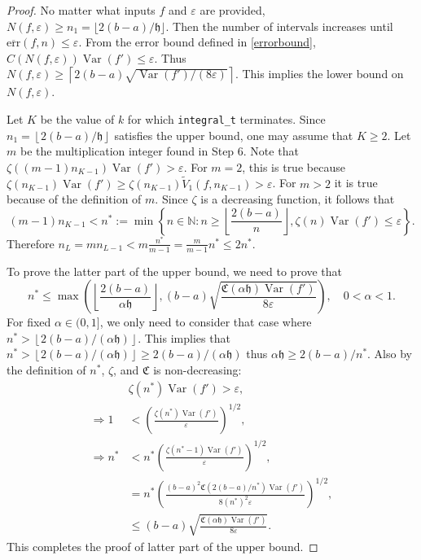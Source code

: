 \documentclass{iitthesis}
\DeclareMathOperator{\Var}{Var}
\theoremstyle{definition}
\theoremstyle{remark}
\begin{document}
\begin{proof}
  No matter what inputs $f$ and $\varepsilon$ are provided, $N(f,\varepsilon)\ge n_1=\lfloor 2(b-a)/\mathfrak{h}\rfloor$. Then the number of intervals increases until $\overline{\text{err}}(f,n)\le\varepsilon$. From the error bound defined in \eqref{errorbound}, $C(N(f,\varepsilon))\Var(f')\leq \varepsilon$. Thus $N(f,\varepsilon)\geq \left\lceil2(b-a)\sqrt{\Var(f')/(8\varepsilon)}\right\rceil$. This implies the lower bound on $N(f,\varepsilon)$.

  Let $K$ be the value of $k$ for which {\tt integral\_t} terminates. Since $n_1=\left\lfloor2(b-a)/\mathfrak{h}\right\rfloor$ satisfies the upper bound, one may assume that $K \ge 2$. Let $m$ be the multiplication integer found in Step 6. Note that $\zeta((m-1)n_{K-1})\Var(f')>\varepsilon$. For $m=2$, this is true because $\zeta(n_{K-1})\Var(f')\ge\zeta(n_{K-1})\widetilde{V}_{1}(f,n_{K-1})>\varepsilon$. For $m>2$ it is true because of the definition of $m$. Since $\zeta$ is a decreasing function, it follows that
  $$(m-1)n_{K-1}<n^*:=\min\left\{n\in\mathbb{N}:n\ge\left\lfloor\frac{2(b-a)}{n}\right\rfloor,\zeta(n)\Var(f')\le\varepsilon\right\}.$$
  Therefore $n_L=mn_{L-1}<m\frac{n^*}{m-1}=\frac{m}{m-1}n^*\le2n^*$.

  To prove the latter part of the upper bound, we need to prove that
  $$n^*\leq\max\left(\left\lfloor\frac{2(b-a)}{\alpha\mathfrak{h}}\right\rfloor,(b-a)\sqrt{\frac{\mathfrak{C}(\alpha\mathfrak{h})\Var(f')}{8\varepsilon}}\right),\quad 0<\alpha<1.$$
  For fixed $\alpha\in(0,1]$, we only need to consider that case where $n^*>\left\lfloor2(b-a)/(\alpha\mathfrak{h})\right\rfloor$. This implies that $n^*>\left\lfloor2(b-a)/(\alpha\mathfrak{h})\right\rfloor\ge 2(b-a)/(\alpha\mathfrak{h})$ thus $\alpha\mathfrak{h}\ge2(b-a)/n^*$. Also by the definition of $n^*$, $\zeta$, and $\mathfrak{C}$ is non-decreasing:
  \begin{align*}
    &\zeta(n^*)\Var(f')>\varepsilon, \\
    \Rightarrow 1&<\left(\frac{\zeta(n^*)\Var(f')}{\varepsilon}\right)^{1/2},\\
    \Rightarrow n^*&<n^*\left(\frac{\zeta(n^*-1)\Var(f')}{\varepsilon}\right)^{1/2},\\
    &=n^*\left(\frac{(b-a)^2\mathfrak{C}(2(b-a)/n^*)\Var(f')}{8(n^*)^2\varepsilon}\right)^{1/2},\\
    &\le(b-a)\sqrt{\frac{\mathfrak{C}(\alpha\mathfrak{h})\Var(f')}{8\varepsilon}}.
  \end{align*}
  This completes the proof of latter part of the upper bound.
\end{proof}
\end{document}
